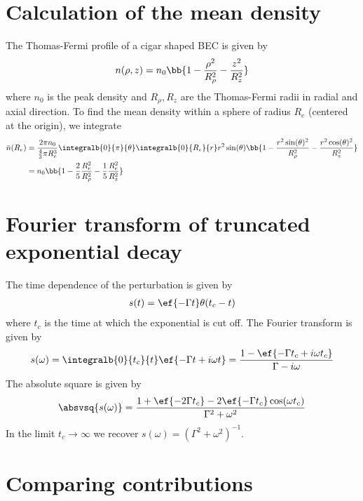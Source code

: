 
\section{Calculation of the mean density}
The Thomas-Fermi profile of a cigar shaped BEC is given by
\begin{align}
n(\rho,z) = n_0 \bb{1-\frac{\rho^2}{R_\rho^2}-\frac{z^2}{R_z^2}}
\end{align}
where $n_0$ is the peak density and $R_\rho, R_z$ are the Thomas-Fermi radii in radial and axial direction. To find the mean density within a sphere of radius $R_e$ (centered at the origin), we integrate
\begin{align}
\bar{n}(R_e)&=\frac{2\pi n_0}{\frac{4}{3} \pi R_e^3} \integralb{0}{\pi}{\theta} \integralb{0}{R_e}{r} r^2 \sin(\theta) \bb{1-\frac{r^2 \sin(\theta)^2}{R_\rho^2}-\frac{r^2 \cos(\theta)^2}{R_z^2}}\\
&= n_0 \bb{1-\frac{2}{5} \frac{R_e^2}{R_\rho^2} - \frac{1}{5} \frac{R_e^2}{R_z^2}}
\end{align}


\section{Fourier transform of truncated exponential decay}
The time dependence of the perturbation is given by
\begin{align}
s(t)=\ef{-\Gamma t} \theta(t_c-t)
\end{align}
where $t_c$ is the time at which the exponential is cut off. The Fourier transform is given by
\begin{align}
s(\omega)=\integralb{0}{t_c}{t} \ef{-\Gamma t+i\omega t}=\frac{1-\ef{-\Gamma t_c + i\omega t_c}}{\Gamma-i\omega}
\end{align}
The absolute square is given by
\begin{align}
\absvsq{s(\omega)}=\frac{1+\ef{-2\Gamma t_c} -2 \ef{-\Gamma t_c} \cos(\omega t_c)}{\Gamma^2+\omega^2}
\end{align}
In the limit $t_c\rightarrow \infty$ we recover $s(\omega)=(\Gamma^2+\omega^2)^{-1}$.

\section{Comparing contributions}
